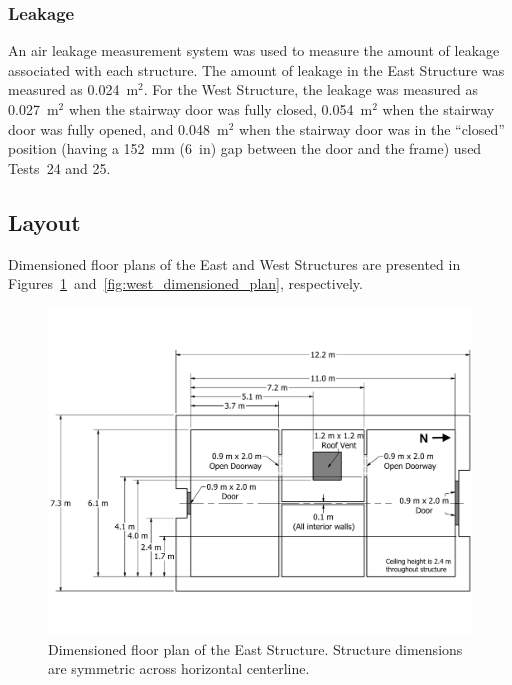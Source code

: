 \documentclass[12pt,oneside]{book}
\begin{document}
\subsubsection{Leakage}
An air leakage measurement system was used to measure the amount of leakage associated with each structure. The amount of leakage in the East Structure was measured as 0.024~m$^2$. For the West Structure, the leakage was measured as 0.027~m$^2$ when the stairway door was fully closed, 0.054~m$^2$ when the stairway door was fully opened, and 0.048~m$^2$ when the stairway door was in the ``closed'' position (having a 152~mm (6~in) gap between the door and the frame) used Tests~24 and 25.
\clearpage

\subsection{Layout}
\label{sec:layout}

Dimensioned floor plans of the East and West Structures are presented in Figures~\ref{fig:east_dimensioned_plan}~and~\ref{fig:west_dimensioned_plan}, respectively.

\begin{figure}[!ht]
	\includegraphics[width=\columnwidth]{../Figures/Floor_Plans/East_Structure_Dimensioned_Full}
	\caption[Dimensioned floor plan of the East Structure.]{Dimensioned floor plan of the East Structure. Structure dimensions are symmetric across horizontal centerline.}
	\label{fig:east_dimensioned_plan}
\end{figure}
\end{document}
